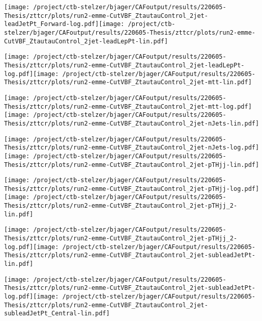 \documentclass{article}
\begin{document}
\texttt{[image: /project/ctb-stelzer/bjager/CAFoutput/results/220605-Thesis/zttcr/plots/run2-emme-CutVBF\_ZtautauControl\_2jet-leadJetPt\_Forward-log.pdf]}\texttt{[image: /project/ctb-stelzer/bjager/CAFoutput/results/220605-Thesis/zttcr/plots/run2-emme-CutVBF\_ZtautauControl\_2jet-leadLepPt-lin.pdf]}

\texttt{[image: /project/ctb-stelzer/bjager/CAFoutput/results/220605-Thesis/zttcr/plots/run2-emme-CutVBF\_ZtautauControl\_2jet-leadLepPt-log.pdf]}\texttt{[image: /project/ctb-stelzer/bjager/CAFoutput/results/220605-Thesis/zttcr/plots/run2-emme-CutVBF\_ZtautauControl\_2jet-mtt-lin.pdf]}

\texttt{[image: /project/ctb-stelzer/bjager/CAFoutput/results/220605-Thesis/zttcr/plots/run2-emme-CutVBF\_ZtautauControl\_2jet-mtt-log.pdf]}\texttt{[image: /project/ctb-stelzer/bjager/CAFoutput/results/220605-Thesis/zttcr/plots/run2-emme-CutVBF\_ZtautauControl\_2jet-nJets-lin.pdf]}

\texttt{[image: /project/ctb-stelzer/bjager/CAFoutput/results/220605-Thesis/zttcr/plots/run2-emme-CutVBF\_ZtautauControl\_2jet-nJets-log.pdf]}\texttt{[image: /project/ctb-stelzer/bjager/CAFoutput/results/220605-Thesis/zttcr/plots/run2-emme-CutVBF\_ZtautauControl\_2jet-pTHjj-lin.pdf]}

\texttt{[image: /project/ctb-stelzer/bjager/CAFoutput/results/220605-Thesis/zttcr/plots/run2-emme-CutVBF\_ZtautauControl\_2jet-pTHjj-log.pdf]}\texttt{[image: /project/ctb-stelzer/bjager/CAFoutput/results/220605-Thesis/zttcr/plots/run2-emme-CutVBF\_ZtautauControl\_2jet-pTHjj\_2-lin.pdf]}

\texttt{[image: /project/ctb-stelzer/bjager/CAFoutput/results/220605-Thesis/zttcr/plots/run2-emme-CutVBF\_ZtautauControl\_2jet-pTHjj\_2-log.pdf]}\texttt{[image: /project/ctb-stelzer/bjager/CAFoutput/results/220605-Thesis/zttcr/plots/run2-emme-CutVBF\_ZtautauControl\_2jet-subleadJetPt-lin.pdf]}

\texttt{[image: /project/ctb-stelzer/bjager/CAFoutput/results/220605-Thesis/zttcr/plots/run2-emme-CutVBF\_ZtautauControl\_2jet-subleadJetPt-log.pdf]}\texttt{[image: /project/ctb-stelzer/bjager/CAFoutput/results/220605-Thesis/zttcr/plots/run2-emme-CutVBF\_ZtautauControl\_2jet-subleadJetPt\_Central-lin.pdf]}
\end{document}
